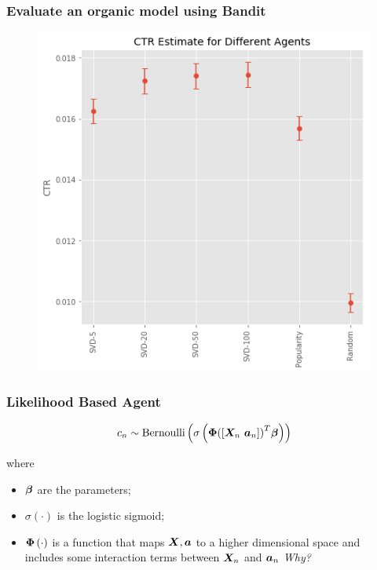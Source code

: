 \begin{frame}
  \frametitle{Evaluate an organic model using Bandit}
\begin{figure}[h!]
\includegraphics[scale=0.4]{images/evalorganicwithbandit7.png}
\centering
\label{motex1}
\end{figure}
\end{frame}



\begin{frame}
  \frametitle{Likelihood Based Agent}

  \[
    c_n \sim {\rm Bernoulli}
      \left(
        \sigma
          \left(
      \bm{\Phi} {\left( [\bm{X}_n ~ \bm{a}_n] \right)}^T \bm{\beta}
          \right)
      \right)
    \]

    where
    \begin{itemize}
      \item $\bm{\beta}$ are the parameters;
      \item $\sigma \left( \cdot \right)$ is the logistic sigmoid;
      \item $\bm{\Phi} \left( \cdot \right)$ is a function that maps $\bm{X},\bm{a}$ to a higher dimensional space and includes some interaction terms between ${\bm{X}}_n$ and ${\bm{a}}_n$ \pause \emph{Why?}
    \end{itemize}
    


\end{frame}

